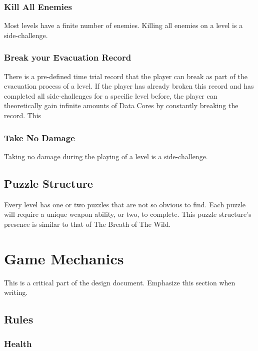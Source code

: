\documentclass[12pt]{article}
\begin{document}
\subsubsection{Kill All Enemies}

Most levels have a finite number of enemies. Killing all enemies on a level is a side-challenge.

\subsubsection{Break your Evacuation Record}

There is a pre-defined time trial record that the player can break as part of the evacuation process of a level. If the player has already broken this record and has completed all side-challenges for a specific level before, the player can theoretically gain infinite amounts of Data Cores by constantly breaking the record. This 

\subsubsection{Take No Damage}

Taking no damage during the playing of a level is a side-challenge. 

\subsection{Puzzle Structure}

Every level has one or two puzzles that are not so obvious to find. Each puzzle will require a unique weapon ability, or two, to complete. This puzzle structure's presence is similar to that of The Breath of The Wild. 

\section{Game Mechanics}

This is a critical part of the design document. Emphasize this section when writing.

\subsection{Rules}

\subsubsection{Health}
\end{document}
